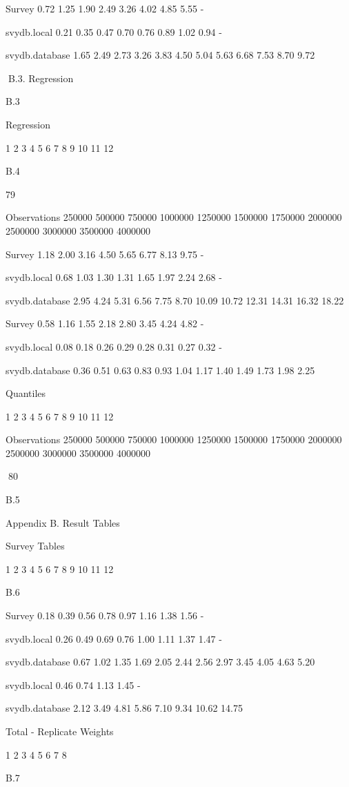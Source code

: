 Survey
0.72
1.25
1.90
2.49
3.26
4.02
4.85
5.55
-

svydb.local
0.21
0.35
0.47
0.70
0.76
0.89
1.02
0.94
-

svydb.database
1.65
2.49
2.73
3.26
3.83
4.50
5.04
5.63
6.68
7.53
8.70
9.72

B.3. Regression

B.3

Regression

1
2
3
4
5
6
7
8
9
10
11
12

B.4

79

Observations
250000
500000
750000
1000000
1250000
1500000
1750000
2000000
2500000
3000000
3500000
4000000

Survey
1.18
2.00
3.16
4.50
5.65
6.77
8.13
9.75
-

svydb.local
0.68
1.03
1.30
1.31
1.65
1.97
2.24
2.68
-

svydb.database
2.95
4.24
5.31
6.56
7.75
8.70
10.09
10.72
12.31
14.31
16.32
18.22

Survey
0.58
1.16
1.55
2.18
2.80
3.45
4.24
4.82
-

svydb.local
0.08
0.18
0.26
0.29
0.28
0.31
0.27
0.32
-

svydb.database
0.36
0.51
0.63
0.83
0.93
1.04
1.17
1.40
1.49
1.73
1.98
2.25

Quantiles

1
2
3
4
5
6
7
8
9
10
11
12

Observations
250000
500000
750000
1000000
1250000
1500000
1750000
2000000
2500000
3000000
3500000
4000000

80

B.5

Appendix B. Result Tables

Survey Tables

1
2
3
4
5
6
7
8
9
10
11
12

B.6

Survey
0.18
0.39
0.56
0.78
0.97
1.16
1.38
1.56
-

svydb.local
0.26
0.49
0.69
0.76
1.00
1.11
1.37
1.47
-

svydb.database
0.67
1.02
1.35
1.69
2.05
2.44
2.56
2.97
3.45
4.05
4.63
5.20

svydb.local
0.46
0.74
1.13
1.45
-

svydb.database
2.12
3.49
4.81
5.86
7.10
9.34
10.62
14.75

Total - Replicate Weights

1
2
3
4
5
6
7
8

B.7

